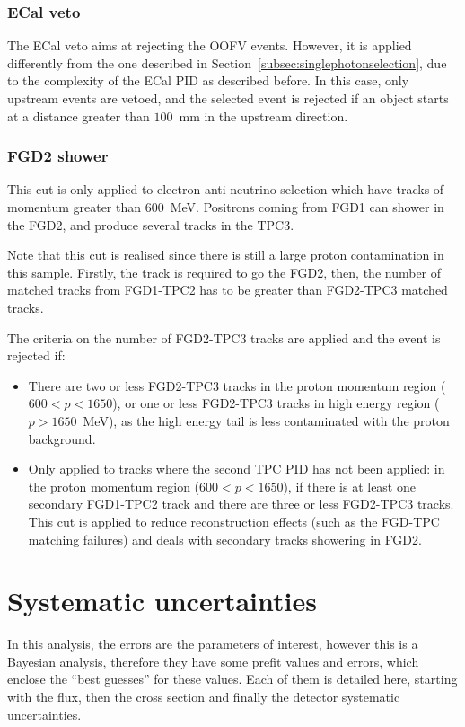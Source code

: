 \subsubsection{\Gls{ECal} veto}
The \Gls{ECal} veto aims at rejecting the \Gls{OOFV} events. However,
it is applied differently from the one described in
Section~\ref{subsec:singlephotonselection}, due to the complexity of
the \Gls{ECal} \Gls{PID} as described before. In this case, only
upstream events are vetoed, and the selected event is rejected if an
object starts at a distance greater than $100$~mm in the upstream
direction.

\subsubsection{FGD2 shower}
\label{subsubsec:fgd2shower}
This cut is only applied to electron anti-neutrino selection which
have tracks of momentum greater than $600$~MeV. Positrons coming from
\Gls{FGD}1 can shower in the \Gls{FGD}2, and produce several tracks in
the \Gls{TPC}3.

Note that this cut is realised since there is still a large proton
contamination in this sample. Firstly, the track is required to go the
\Gls{FGD}2, then, the number of matched tracks from
\Gls{FGD}1-\Gls{TPC}2 has to be greater than \Gls{FGD}2-\Gls{TPC}3
matched tracks.

The criteria on the number of \Gls{FGD}2-\Gls{TPC}3 tracks are applied
and the event is rejected if:
\begin{itemize}[noitemsep,topsep=0pt]
\item There are two or less \Gls{FGD}2-\Gls{TPC}3 tracks in the proton
  momentum region ($600 < p < 1650$), or one or less
  \Gls{FGD}2-\Gls{TPC}3 tracks in high energy region ($p > 1650$~MeV),
  as the high energy tail is less contaminated with the proton
  background.
\item Only applied to tracks where the second \Gls{TPC} \Gls{PID} has
  not been applied: in the proton momentum region ($600 < p < 1650$),
  if there is at least one secondary \Gls{FGD}1-\Gls{TPC}2 track and
  there are three or less \Gls{FGD}2-\Gls{TPC}3 tracks. This cut is
  applied to reduce reconstruction effects (such as the
  \Gls{FGD}-\Gls{TPC} matching failures) and deals with secondary
  tracks showering in \Gls{FGD}2.
\end{itemize}

\section{Systematic uncertainties}
\label{subsec:systematicsbanff}
In this analysis, the errors are the parameters of interest, however
this is a Bayesian analysis, therefore they have some prefit values
and errors, which enclose the ``best guesses'' for these values. Each
of them is detailed here, starting with the flux, then the cross
section and finally the detector systematic uncertainties.

